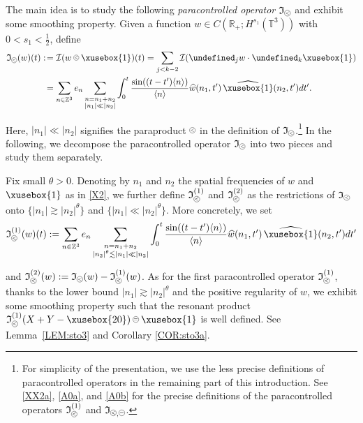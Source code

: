 \documentclass[%
11pt,  reqno]{amsart}
\def\<#1>{\xusebox{#1}}
\newcommand{\pe}{\mathbin{\scaleobj{0.7}{\tikz \draw (0,0) node[shape=circle,draw,inner sep=0pt,minimum size=8.5pt] {\scriptsize  $=$};}}}
\newcommand{\pl}{\mathbin{\scaleobj{0.7}{\tikz \draw (0,0) node[shape=circle,draw,inner sep=0pt,minimum size=8.5pt] {\scriptsize $<$};}}}
\newcommand{\1}{\hspace{0.2mm}\text{I}\hspace{0.2mm}}
\newcommand{\noi}{\noindent}
\newcommand{\Z}{\mathbb{Z}}
\newcommand{\R}{\mathbb{R}}
\newcommand{\T}{\mathbb{T}}
\let\P= \undefined
\newcommand{\P}{\mathbf{P}}
\newcommand{\ft}{\widehat}
\newcommand{\les}{\lesssim}
\newcommand{\ges}{\gtrsim}
\newcommand{\jb}[1]
{\langle #1 \rangle}
\newcommand{\I}{\mathcal{I}}
\newcommand{\If}{\mathfrak{I}}
\numberwithin{equation}{section}
\numberwithin{theorem}{section}
\begin{document}
The main idea is to study the following {\it paracontrolled operator} $\If_{\pl}$
 and exhibit some smoothing property.
Given a function $w \in C(\R_+; H^{s_1}(\T^3) )$ with $0 < s_1 < \frac 12$, define
\begin{align}
\begin{split}
 \If_{\pl}(w) (t)
:\! & =  \I (w\pl \<1>)(t) 
 = \sum_{j < k - 2} \I (\P_j w \cdot \P_k \<1>)\\
& =       \sum_{n \in \Z^3}
e_n  \sum_{\substack{n =  n_1 +  n_2\\  |n_1| \ll |n_2|}}
\int_0^t \frac{\sin ((t - t') \jb{n})}{\jb{n}} 
\ft w(n_1, t')\,  \ft{ \<1>}(n_2, t') dt'.
\end{split}
\label{X2}
\end{align}





\noi
Here, $|n_1| \ll |n_2|$ signifies the paraproduct $\pl$
in the definition of $\If_{\pl}$.\footnote{For simplicity of the presentation, 
we use the less precise definitions of paracontrolled operators
in the remaining part of this introduction.
See \eqref{XX2a}, \eqref{A0a},  and \eqref{A0b}
for the precise definitions of 
the paracontrolled operators $ \If_{\pl}^{(1)}$ 
and $\If_{\pl, \pe}$.}
In the following, we decompose the paracontrolled operator
$\If_{\pl}$ into two pieces
and study them separately.


Fix small $\theta  > 0$.
Denoting by $n_1$ and $n_2$ the spatial frequencies
of $w$ and $\<1>$ as in \eqref{X2}, 
we further define $ \If_{\pl}^{(1)}$ and $ \If_{\pl}^{(2)}$ 
as the restrictions of $\If_{\pl}$ onto $\{ |n_1| \ges |n_2|^{\theta}\}$
and  $\{ |n_1| \ll |n_2|^{\theta}\}$.
More concretely, we set 
\begin{align}
 \If_{\pl}^{(1)}(w)(t) 
: = \sum_{n \in \Z^3}
e_n  \sum_{\substack{n =  n_1 +  n_2\\    |n_2|^\theta \les |n_1| \ll |n_2|}}
\int_0^t \frac{\sin ((t - t') \jb{n})}{\jb{n}} 
\ft w(n_1, t')\,  \ft{ \<1>}(n_2, t') dt'
\label{X3}
\end{align}

\noi
and $ \If_{\pl}^{(2)}(w)   := \If_{\pl}(w) - \If_{\pl}^{(1)}(w)$.
As for the first paracontrolled operator $ \If_{\pl}^{(1)}$, 
thanks to the lower bound  $|n_1| \ges |n_2|^\theta$ 
 and the positive regularity of $w$, 
we exhibit some smoothing property
such that 
 the resonant product 
$ \If_{\pl}^{(1)}(X+Y-\<20>) \pe \<1>$ is well defined.
See Lemma~\ref{LEM:sto3}
and Corollary \ref{COR:sto3a}.
\end{document}
